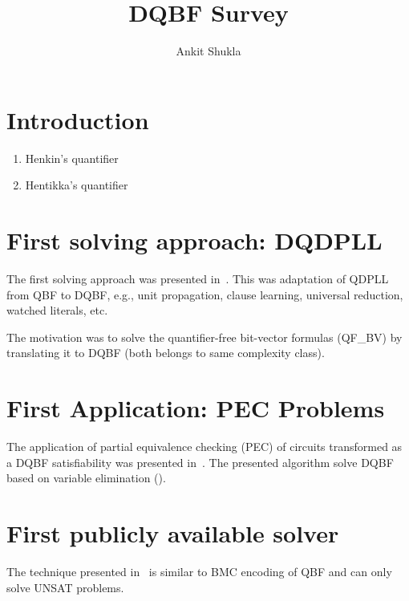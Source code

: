 \documentclass{article}
\begin{document}
\title{DQBF Survey}

\author{
    Ankit Shukla
}



\maketitle

\begin{abstract}

\end{abstract}

\section{Introduction}
\label{sec:intro}
\begin{enumerate}
  \item Henkin's quantifier
  \item Hentikka's quantifier
\end{enumerate}

\section{First solving approach: DQDPLL}
The first solving approach was presented in~\cite{frohlich2012dpll}.
%
This was adaptation of QDPLL from QBF to DQBF, e.g., unit propagation, clause
learning, universal reduction, watched literals, etc.
%

The motivation was to solve the quantifier-free bit-vector formulas (QF\_BV) by translating it to DQBF (both belongs to same complexity class).

\section{First Application: PEC Problems}
The application of partial equivalence checking (PEC) of circuits transformed as a DQBF satisfiability was presented in~\cite{gitina2013equivalence}.
%
The presented algorithm solve DQBF based on variable elimination (\cite{biere2004resolve}).

\section{First publicly available solver}
The technique presented in~\cite{finkbeiner2014fast} is similar to BMC encoding of QBF and can only solve UNSAT problems.  
\end{document}
